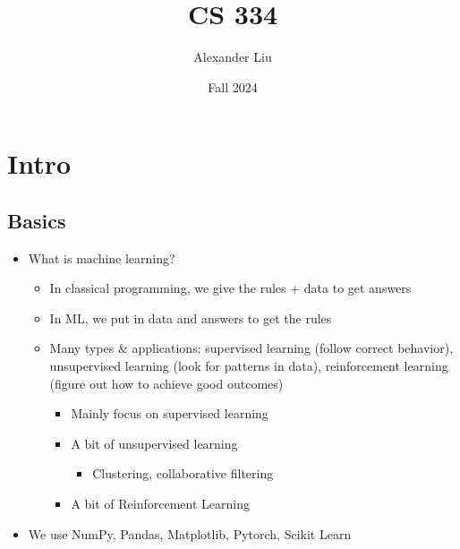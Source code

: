 \documentclass[10pt, oneside]{article}
\title{CS 334}
\author{Alexander Liu}
\date{Fall 2024}
\begin{document}
\maketitle
\tableofcontents

\vspace{.25in}

\section{Intro}
\subsection{Basics}
\begin{itemize}
    \item What is machine learning?
    \begin{itemize}
        \item In classical programming, we give the rules + data to get answers
        \item In ML, we put in data and answers to get the rules
        \item Many types \& applications: supervised learning (follow correct behavior), unsupervised learning (look for patterns in data), reinforcement learning (figure out how to achieve good outcomes)
        \begin{itemize}
            \item Mainly focus on supervised learning
            \item A bit of unsupervised learning
            \begin{itemize}
                \item Clustering, collaborative filtering
            \end{itemize}
            \item A bit of Reinforcement Learning
        \end{itemize}
    \end{itemize}
    \item We use NumPy, Pandas, Matplotlib, Pytorch, Scikit Learn
\end{itemize}
\end{document}
